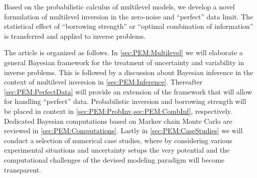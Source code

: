 Based on the probabilistic calculus of multilevel models, we develop a novel formulation of multilevel inversion in the zero-noise and ``perfect'' data limit.
The statistical effect of ``borrowing strength'' or ``optimal combination of information'' is transferred and applied to inverse problems.
\par %
The article is organized as follows.
In \cref{sec:PEM:Multilevel} we will elaborate a general Bayesian framework for the treatment of uncertainty and variability in inverse problems.
This is followed by a discussion about Bayesian inference in the context of multilevel inversion in \cref{sec:PEM:Inference}.
Thereafter \cref{sec:PEM:PerfectData} will provide an extension of the framework that will allow for handling ``perfect'' data.
Probabilistic inversion and borrowing strength will be placed in context in \cref{sec:PEM:ProbInv,sec:PEM:CombInf}, respectively.
Dedicated Bayesian computations based on Markov chain Monte Carlo are reviewed in \cref{sec:PEM:Computations}.
Lastly in \cref{sec:PEM:CaseStudies} we will conduct a selection of numerical case studies, where by considering various experimental situations and uncertainty setups
the very potential and the computational challenges of the devised modeling paradigm will become transparent.